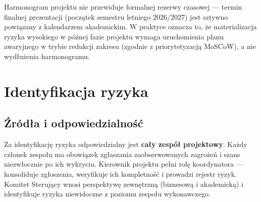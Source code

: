 \documentclass[11pt,a4paper]{article}
\begin{document}
	Harmonogram projektu nie przewiduje formalnej rezerwy czasowej --- termin finalnej
	prezentacji (początek semestru letniego 2026/2027) jest sztywno powiązany z kalendarzem
	akademickim. W praktyce oznacza to, że materializacja ryzyka wysokiego w późnej fazie
	projektu wymaga uruchomienia planu awaryjnego w trybie redukcji zakresu (zgodnie z
	priorytetyzacją MoSCoW), a nie wydłużenia harmonogramu.
	
	\section{Identyfikacja ryzyka}\label{sec:identyfikacja}
	
	\subsection{Źródła i odpowiedzialność}
	Za identyfikację ryzyka odpowiedzialny jest \textbf{cały zespół projektowy}.
	Każdy członek zespołu ma obowiązek zgłaszania zaobserwowanych zagrożeń i szans
	niezwłocznie po ich wykryciu. Kierownik projektu pełni rolę koordynatora --- konsoliduje
	zgłoszenia, weryfikuje ich kompletność i prowadzi rejestr ryzyk. Komitet Sterujący wnosi
	perspektywę zewnętrzną (biznesową i akademicką) i identyfikuje ryzyka niewidoczne z
	poziomu zespołu wykonawczego.
	
\end{document}
